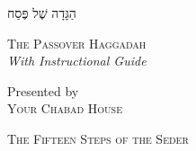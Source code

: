 \documentclass[11pt, openany]{book}
\newif\ifshowpageornaments
\begin{document}
\clearpage

\thispagestyle{empty}
\mbox{}
\clearpage

\thispagestyle{empty}

\vspace*{1.5in}

\begin{center}
  {\hebrewfontlarge{}\beginR\textcolor{sederblue}{הַגָּדָה שֶׁל פֶּסַח}\endR}

  \vspace{0.4in}

  {\LARGE\scshape\textcolor{sederblue}{The Passover Haggadah}}\\[12pt]
  {\large\textcolor{sederwine}{\itshape With Instructional Guide}}

  \vspace{0.5in}

  \textcolor{sedergold}{}

  \vspace{0.5in}

  {\normalsize Presented by\\[4pt]
  {\Large\scshape Your Chabad House}\\[8pt]
  \textcolor{sedergold}{}}
\end{center}

\vspace*{\fill}

\clearpage

\showpageornamentstrue  %
\thispagestyle{empty}

\vspace*{0.3in}

\begin{center}
  \textcolor{sedergold}{}
  \hspace{0.3in}
  {\Large\scshape\textcolor{sederblue}{The Fifteen Steps of the Seder}}
  \hspace{0.3in}
  \textcolor{sedergold}{}
\end{center}

\vspace{0.3in}
\end{document}
